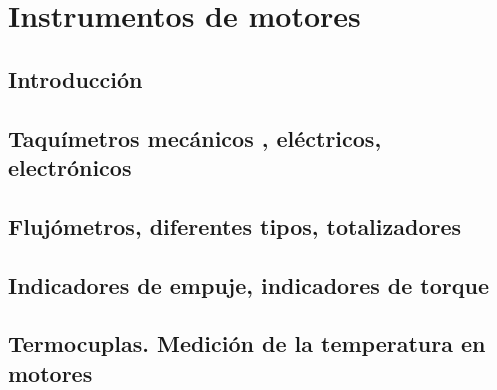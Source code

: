 
\chapter{Instrumentos de motores}
\label{chap:U03.instrumentos.de.motores}




\section{Introducci\'on}
\label{sec:U03.00.introduccion}




\section{Taquímetros mecánicos , eléctricos, electrónicos}
\label{sec:U03.01.taquimetros}

\section{Flujómetros, diferentes tipos, totalizadores}
\label{sec:U03.02.flujometros}

\section{Indicadores de empuje, indicadores de torque}
\label{sec:U03.03.indicadores.empuje}

\section{Termocuplas. Medición de la temperatura en motores}
\label{sec:U03.termocuplas}